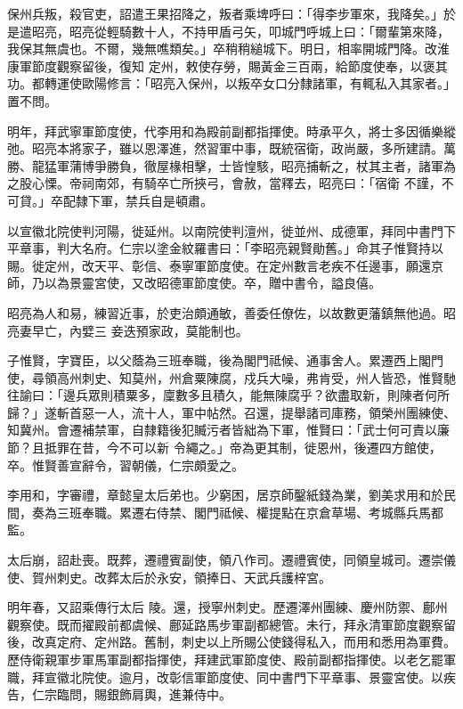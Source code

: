 \begin{pinyinscope}
 保州兵叛，殺官吏，詔遣王果招降之，叛者乘埤呼曰：「得李步軍來，我降矣。」於是遣昭亮，昭亮從輕騎數十人，不持甲盾弓矢，叩城門呼城上曰：「爾輩第來降，我保其無虞也。不爾，幾無噍類矣。」卒稍稍縋城下。明日，相率開城門降。改淮康軍節度觀察留後，復知
 定州，敕使存勞，賜黃金三百兩，給節度使奉，以褒其功。都轉運使歐陽修言：「昭亮入保州，以叛卒女口分隸諸軍，有輒私入其家者。」置不問。



 明年，拜武寧軍節度使，代李用和為殿前副都指揮使。時承平久，將士多因循樂縱弛。昭亮本將家子，雖以恩澤進，然習軍中事，既統宿衛，政尚嚴，多所建請。萬勝、龍猛軍蒲博爭勝負，徹屋椽相擊，士皆惶駭，昭亮捕斬之，杖其主者，諸軍為之股心慄。帝祠南郊，有騎卒亡所挾弓，會赦，當釋去，昭亮曰：「宿衛
 不謹，不可貸。」卒配隸下軍，禁兵自是頓肅。



 以宣徽北院使判河陽，徙延州。以南院使判澶州，徙並州、成德軍，拜同中書門下平章事，判大名府。仁宗以塗金紋羅書曰：「李昭亮親賢勛舊。」命其子惟賢持以賜。徙定州，改天平、彰信、泰寧軍節度使。在定州數言老疾不任邊事，願還京師，乃以為景靈宮使，又改昭德軍節度使。卒，贈中書令，謚良僖。



 昭亮為人和易，練習近事，於吏治頗通敏，善委任僚佐，以故數更藩鎮無他過。昭亮妻早亡，內嬖三
 妾迭預家政，莫能制也。



 子惟賢，字寶臣，以父蔭為三班奉職，後為閣門祗候、通事舍人。累遷西上閣門使，尋領高州刺史、知莫州，州倉粟陳腐，戍兵大噪，弗肯受，州人皆恐，惟賢馳往諭曰：「邊兵眾則積粟多，廩數多且積久，能無陳腐乎？欲盡取新，則陳者何所歸？」遂斬首惡一人，流十人，軍中帖然。召還，提舉諸司庫務，領榮州團練使、知冀州。會遷補禁軍，自隸籍後犯贓污者皆絀為下軍，惟賢曰：「武士何可責以廉節？且抵罪在昔，今不可以新
 令繩之。」帝為更其制，徙恩州，後遷四方館使，卒。惟賢善宣辭令，習朝儀，仁宗頗愛之。



 李用和，字審禮，章懿皇太后弟也。少窮困，居京師鑿紙錢為業，劉美求用和於民間，奏為三班奉職。累遷右侍禁、閣門祗候、權提點在京倉草場、考城縣兵馬都監。



 太后崩，詔赴喪。既葬，遷禮賓副使，領八作司。遷禮賓使，同領皇城司。遷崇儀使、賀州刺史。改葬太后於永安，領捧日、天武兵護梓宮。



 明年春，又詔乘傳行太后
 陵。還，授寧州刺史。歷遷澤州團練、慶州防禦、鄜州觀察使。既而擢殿前都虞候、鄜延路馬步軍副都總管。未行，拜永清軍節度觀察留後，改真定府、定州路。舊制，刺史以上所賜公使錢得私入，而用和悉用為軍費。歷侍衛親軍步軍馬軍副都指揮使，拜建武軍節度使、殿前副都指揮使。以老乞罷軍職，拜宣徽北院使。逾月，改彰信軍節度使、同中書門下平章事、景靈宮使。以疾告，仁宗臨問，賜銀飾肩輿，進兼侍中。




\end{pinyinscope}
